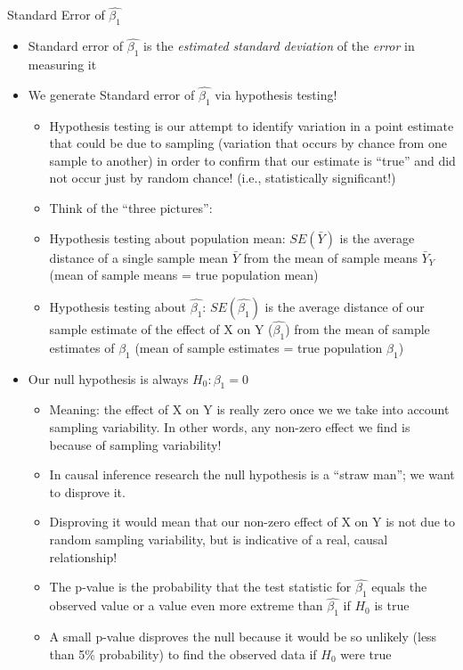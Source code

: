 \documentclass[
  8pt,
  ignorenonframetext,
  dvipsnames]{beamer}
\providecommand{\tightlist}{%
  \setlength{\itemsep}{0pt}\setlength{\parskip}{0pt}}
\let\olditem\item
\renewcommand{\item}{%
  \olditem\vspace{4pt}
}
\begin{document}
\begin{frame}{Standard Error of \(\hat{\beta_1}\)}
\protect\hypertarget{standard-error-of-hatbeta_1}{}

\begin{itemize}
\item
  Standard error of \(\hat{\beta_1}\) is the \emph{estimated standard
  deviation} of the \emph{error} in measuring it
\item
  We generate Standard error of \(\hat{\beta_1}\) via hypothesis
  testing!

  \begin{itemize}
  \tightlist
  \item
    Hypothesis testing is our attempt to identify variation in a point
    estimate that could be due to sampling (variation that occurs by
    chance from one sample to another) in order to confirm that our
    estimate is ``true'' and did not occur just by random chance! (i.e.,
    statistically significant!)
  \item
    Think of the ``three pictures'':
  \item
    Hypothesis testing about population mean: \(SE(\bar{Y})\) is the
    average distance of a single sample mean \(\bar{Y}\) from the mean
    of sample means \(\bar{Y}_Y\) (mean of sample means = true
    population mean)
  \item
    Hypothesis testing about \(\hat{\beta_1}\): \(SE(\hat{\beta_1})\) is
    the average distance of our sample estimate of the effect of X on Y
    (\(\hat{\beta_1}\)) from the mean of sample estimates of \(\beta_1\)
    (mean of sample estimates = true population \(\beta_1\))
  \end{itemize}
\item
  Our null hypothesis is always \(H_0: \beta_1 = 0\)

  \begin{itemize}
  \tightlist
  \item
    Meaning: the effect of X on Y is really zero once we we take into
    account sampling variability. In other words, any non-zero effect we
    find is because of sampling variability!
  \item
    In causal inference research the null hypothesis is a ``straw man'';
    we want to disprove it.
  \item
    Disproving it would mean that our non-zero effect of X on Y is not
    due to random sampling variability, but is indicative of a real,
    causal relationship!
  \item
    The p-value is the probability that the test statistic for
    \(\hat{\beta_1}\) equals the observed value or a value even more
    extreme than \(\hat{\beta_1}\) if \(H_0\) is true
  \item
    A small p-value disproves the null because it would be so unlikely
    (less than 5\% probability) to find the observed data if \(H_0\)
    were true
  \end{itemize}
\end{itemize}

\end{frame}
\end{document}
